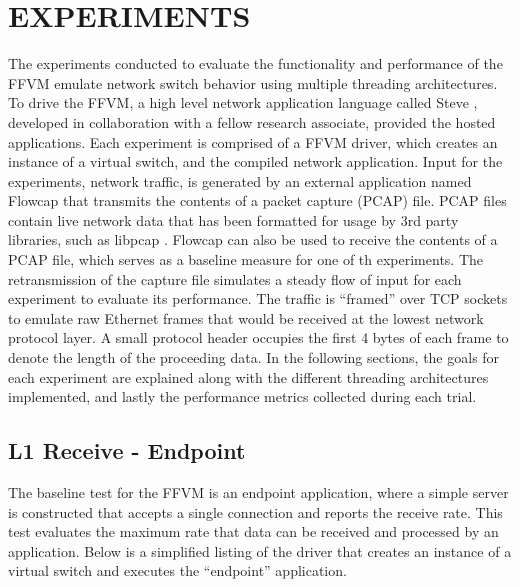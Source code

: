 \chapter{EXPERIMENTS}
\label{expr}
The experiments conducted to evaluate the functionality and performance of
the FFVM emulate network switch behavior using multiple threading architectures.
To drive the FFVM, a high level network application language called Steve
\cite{steve}, developed in collaboration with a fellow research associate,
provided the hosted applications. Each experiment is comprised of a FFVM
driver, which creates an instance of a virtual switch, and the compiled network
application. Input for the experiments, network traffic, is generated by an
external application named Flowcap that transmits the contents of a packet
capture (PCAP) file. PCAP files contain live network data that has been
formatted for usage by 3rd party libraries, such as libpcap \cite{pcap}.
Flowcap can also be used to receive the contents of a PCAP file, which serves
as a baseline measure for one of th experiments. The retransmission of
the capture file simulates a steady flow of input for each experiment to
evaluate its performance. The traffic is ``framed'' over TCP sockets to
emulate raw Ethernet frames that would be received at the lowest network
protocol layer. A small protocol header occupies the first 4 bytes of each
frame to denote the length of the proceeding data. In the following sections,
the goals for each experiment are explained along with the different threading
architectures implemented, and lastly the performance metrics collected during
each trial.

\section{L1 Receive - Endpoint}
\label{expr:endpoint}
The baseline test for the FFVM is an endpoint application, where a simple
server is constructed that accepts a single connection and reports the
receive rate. This test evaluates the maximum rate that data can be received
and processed by an application. Below is a simplified listing of the driver
that creates an instance of a virtual switch and executes the ``endpoint''
application.

